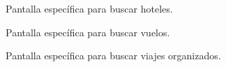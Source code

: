 \documentclass[12pt,a4paper,titlepage]{article}
\begin{document}
\begin{figure}[hbtp]   
	\begin{center} 
		\caption{Pantalla específica para buscar hoteles.} 
		\label{maqHotel}
	\end{center}  
\end{figure}

\begin{figure}[hbtp]   
	\begin{center} 
		\caption{Pantalla específica para buscar vuelos.} 
		\label{maqVuelo}
	\end{center}  
\end{figure}

\begin{figure}[hbtp]   
	\begin{center} 
		\caption{Pantalla específica para buscar viajes organizados.} 
		\label{maqOrganizado}
	\end{center}  
\end{figure}
\end{document}
